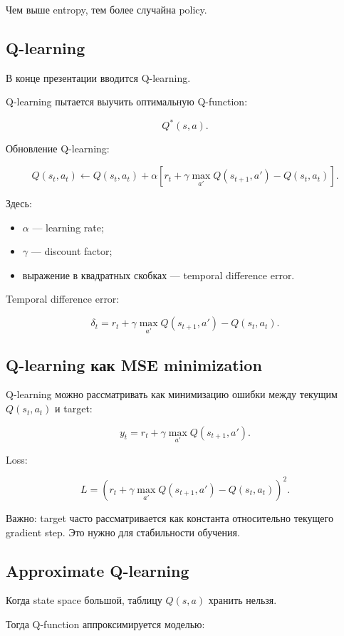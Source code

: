 \documentclass[a4paper,12pt]{article}
\begin{document}
Чем выше entropy, тем более случайна policy.

\subsection{Q-learning}

В конце презентации вводится Q-learning.

Q-learning пытается выучить оптимальную Q-function:

\[
Q^*(s,a).
\]

Обновление Q-learning:

\[
Q(s_t,a_t)
\leftarrow
Q(s_t,a_t)
+
\alpha
\left[
r_t
+
\gamma \max_{a'} Q(s_{t+1},a')
-
Q(s_t,a_t)
\right].
\]

Здесь:

\begin{itemize}
    \item \(\alpha\) --- learning rate;
    \item \(\gamma\) --- discount factor;
    \item выражение в квадратных скобках --- temporal difference error.
\end{itemize}

Temporal difference error:

\[
\delta_t
=
r_t
+
\gamma \max_{a'}Q(s_{t+1},a')
-
Q(s_t,a_t).
\]

\subsection{Q-learning как MSE minimization}

Q-learning можно рассматривать как минимизацию ошибки между текущим \(Q(s_t,a_t)\) и target:

\[
y_t =
r_t + \gamma \max_{a'}Q(s_{t+1},a').
\]

Loss:

\[
L
=
\left(
r_t
+
\gamma \max_{a'}Q(s_{t+1},a')
-
Q(s_t,a_t)
\right)^2.
\]

Важно: target часто рассматривается как константа относительно текущего gradient step. Это нужно для стабильности обучения.

\subsection{Approximate Q-learning}

Когда state space большой, таблицу \(Q(s,a)\) хранить нельзя.

Тогда Q-function аппроксимируется моделью:
\end{document}

